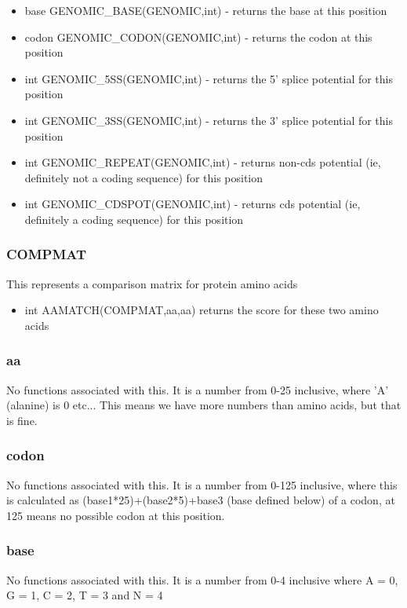 \begin{itemize}
\item base GENOMIC\_BASE(GENOMIC,int) - returns the base at this position
\item codon GENOMIC\_CODON(GENOMIC,int) - returns the codon at this position
\item int GENOMIC\_5SS(GENOMIC,int) - returns the 5' splice potential for this position
\item int GENOMIC\_3SS(GENOMIC,int) - returns the 3' splice potential for this position
\item int GENOMIC\_REPEAT(GENOMIC,int) - returns non-cds potential (ie, definitely not a coding sequence) for this position
\item int GENOMIC\_CDSPOT(GENOMIC,int) - returns cds potential (ie, definitely a coding sequence) for this position
\end{itemize}

\subsubsection{COMPMAT}
This represents a comparison matrix for protein amino acids


\begin{itemize}
\item int AAMATCH(COMPMAT,aa,aa) returns the score for these two amino acids
\end{itemize}


\subsubsection{aa}
No functions associated with this. It is a number from 0-25 inclusive, where
'A' (alanine) is 0 etc... This means we have more numbers than amino acids, 
but that is fine.

\subsubsection{codon}
No functions associated with this. It is a number from 0-125 inclusive, where
this is calculated as \mbox{(base1*25)+(base2*5)+base3} (base defined below) of 
a codon, at 125 means no possible codon at this position.

\subsubsection{base}
No functions associated with this. It is a number from 0-4 inclusive where
A = 0, G = 1, C = 2, T = 3 and N = 4

